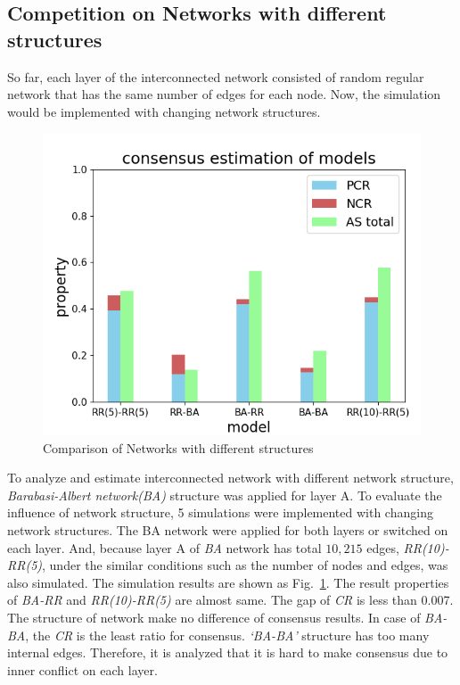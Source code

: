 \documentclass[english]{cccconf}
\begin{document}
\subsection{Competition on Networks with different structures}
So far, each layer of the interconnected network consisted of random regular network that has the same number of edges for each node. Now, the simulation would be implemented with changing network structures. 

\begin{figure}[!htb]
	\centering
	\includegraphics[width=\hsize]{FIG7.png}
	\caption{Comparison of Networks with different structures}
	\label{Fig7}
\end{figure}

To analyze and estimate interconnected network with different network structure, \textit{Barabasi-Albert network(BA)}\cite{barabasi1999} structure was applied for layer A. To evaluate the influence of network structure, 5 simulations were implemented with changing network structures. The BA network were applied for both layers or switched on each layer. And, because layer A of \textit{BA} network has total $10,215$ edges, \textit{RR(10)-RR(5)}, under the similar conditions such as the number of nodes and edges, was also simulated. The simulation results are shown as Fig.~\ref{Fig7}. The result properties of \textit{BA-RR} and \textit{RR(10)-RR(5)} are almost same. The gap of \textit{CR} is less than 0.007. The structure of network make no difference of consensus results. In case of \textit{BA-BA}, the \textit{CR} is the least ratio for consensus. \textit{`BA-BA'} structure has too many internal edges. Therefore, it is analyzed that it is hard to make consensus due to inner conflict on each layer. 
\end{document}
